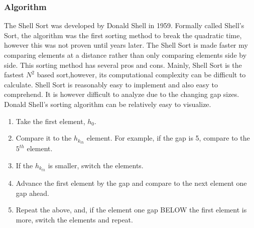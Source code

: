 \documentclass{article}
\begin{document}
   \subsubsection{Algorithm}
        The Shell Sort was developed by Donald Shell in 1959. Formally called
        Shell's Sort, the algorithm was the first sorting method to break the 
        quadratic time, however this was not proven until years later. The 
        Shell Sort is made faster my comparing elements at a distance rather 
        than only comparing elements side by side. This sorting method has
        several pros and cons\cite{introalg}. Mainly, Shell Sort is the
        fastest $N^2$ based sort,however, its computational complexity can be
        difficult to calculate\cite{princton}. Shell Sort is reasonably easy to
        implement and also easy to comprehend. It is however difficult to
        analyze due to the changing gap sizes.
        Donald Shell's sorting algorithm can be relatively easy to visualize.
        \begin{enumerate}
            \item Take the first element, $h_0$.
            \item Compare it to the $h_{k_{th}}$ element. For example, if the 
            gap is 5, compare to the $5^{th}$ element. 
            \item If the $h_{k_{th}}$ is smaller, switch the elements.
            \item Advance the first element by the gap and compare to the next 
            element one gap ahead.
            \item Repeat the above, and, if the element one gap BELOW the first
            element is more, switch the elements and repeat.
        \end{enumerate}
\end{document}

